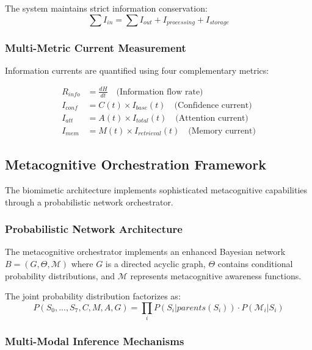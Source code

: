 \documentclass[12pt,a4paper]{article}
\begin{document}
The system maintains strict information conservation:
\begin{equation}
\sum I_{in} = \sum I_{out} + I_{processing} + I_{storage}
\end{equation}

\subsubsection{Multi-Metric Current Measurement}

Information currents are quantified using four complementary metrics:

\begin{align}
R_{info} &= \frac{dH}{dt} \quad \text{(Information flow rate)} \\
I_{conf} &= C(t) \times I_{base}(t) \quad \text{(Confidence current)} \\
I_{att} &= A(t) \times I_{total}(t) \quad \text{(Attention current)} \\
I_{mem} &= M(t) \times I_{retrieval}(t) \quad \text{(Memory current)}
\end{align}

\subsection{Metacognitive Orchestration Framework}

The biomimetic architecture implements sophisticated metacognitive capabilities through a probabilistic network orchestrator.

\subsubsection{Probabilistic Network Architecture}

The metacognitive orchestrator implements an enhanced Bayesian network $B = (G, \Theta, \mathcal{M})$ where $G$ is a directed acyclic graph, $\Theta$ contains conditional probability distributions, and $\mathcal{M}$ represents metacognitive awareness functions.

The joint probability distribution factorizes as:
\begin{equation}
P(S_0,...,S_7,C,M,A,G) = \prod_{i} P(S_i | parents(S_i)) \cdot P(\mathcal{M}_i | S_i)
\end{equation}

\subsubsection{Multi-Modal Inference Mechanisms}
\end{document}
